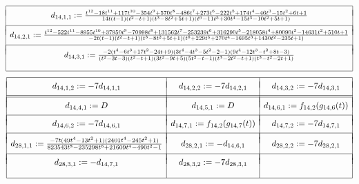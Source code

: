 \begin{table}[!ht]
\[
\begin{array}{|c|}
\hline
\\ [-.75em]
d_{14,1,1} := \frac{t^{12} - 18t^{11} + 117t^{10} - 354t^9 + 570t^8 - 486t^7 + 273t^6 - 222t^5 + 174t^4 - 46t^3 - 15t^2 + 6t + 1}{14t(t-1)(t^2-t+1)(t^3-8t^2+5t+1)(t^6 - 11t^5 + 30t^4 - 15t^3 - 10t^2 + 5t + 1)} \\
\\ [-.75em]
\hline
\\ [-.75em]
d_{14,2,1} := \frac{t^{12} - 522t^{11} - 8955t^{10} + 37950t^9 - 70998t^8 + 131562t^7 - 253239t^6 + 316290t^5 - 218058t^4 + 80090t^3 - 14631t^2 + 510t + 1}{-2t(t-1)(t^2-t+1)(t^3-8t^2+5t+1)(t^6 + 229t^5 + 270t^4 - 1695t^3 + 1430t^2 - 235t + 1)} \\
\\ [-.75em]
\hline
\\ [-.75em]
d_{14,3,1} :=  \frac{-2(t^4 - 6t^3 + 17t^2 - 24t + 9)(3t^4 - 4t^3 - 5t^2 - 2 - 1)(9t^4 - 12t^3 - t^2 + 8t - 3)}{(t^2 - 3t-3)(t^2 - t + 1)(3t^2 - 9t + 5)(5t^2 - t - 1)(t^3 - 2t^2 - t + 1)(t^3 - t^2 - 2t + 1)} \\
\\
\hline
\end{array}
\]
\[
\begin{array}{|c|c|c|}
\hline
& & \\ [-.75em]
d_{14,1,2} := -7d_{14,1,1} & d_{14,2,2} := -7d_{14,2,1} & d_{14,3,2} := -7d_{14,3,1} \\
& & \\ [-.75em]
\hline
\hline
& & \\ [-.75em]
d_{14,4,1} := D & d_{14,5,1} := D & d_{14,6,1} := f_{14,2}(g_{14,6}(t)) \\
& & \\ [-.75em]
\hline
& & \\ [-.75em]
d_{14,6,2} := -7 d_{14,6,1} & d_{14,7,1} :=  f_{14,2}(g_{14,7}(t)) & d_{14,7,2} := -7 d_{14,7,1} \\
& & \\ [-.75em]
\hline
& & \\ [-.75em]
d_{28,1,1} := \frac{-7t(49t^4 - 13t^2 + 1)(2401t^4 - 245t^2 + 1)}{823543t^8 - 235298t^6 + 21609t^4 - 490t^2 - 1} & d_{28,2,1} := - d_{14,6,1} & d_{28,2,2} := -7 d_{28,2,1} \\
& & \\ [-.75em]
\hline
& & \\ [-.75em]
 d_{28,3,1} :=  - d_{14,7,1}  & d_{28,3,2}  :=  -7 d_{28,3,1} & \\
& & \\ 
\hline
\end{array}
\]

\vspace{.1in}
\caption{ Twist parameters associated to maximal genus zero missing trace groups }
\label{masterlistoftwistparameters2}
\end{table}
